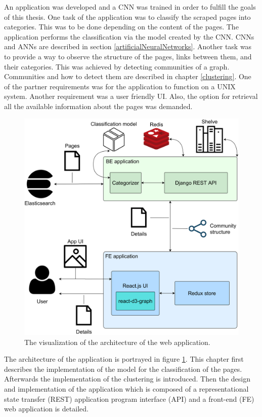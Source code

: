 \label{developmentIntroduction}
An application was developed and a CNN was trained in order to fulfill the goals of this thesis. One task of the application was to classify the scraped pages into categories. This was to be done depending on the content of the pages. The application performs the classification via the model created by the CNN. CNNs and ANNs are described in section \ref{artificialNeuralNetworks}. Another task was to provide a way to observe the structure of the pages, links between them, and their categories. This was achieved by detecting communities of a graph. Communities and how to detect them are described in chapter \ref{clustering}. One of the partner requirements was for the application to function on a UNIX system. Another requirement was a user friendly UI. Also, the option for retrieval all the available information about the pages was demanded. 

\begin{figure}
  \centering
  \includegraphics[width = \textwidth]{Images/ApplicationArchitecture.png}
  \caption{The visualization of the architecture of the web application.}
  \label{ApplicationArchitecture}
\end{figure}

The architecture of the application is portrayed in figure \ref{ApplicationArchitecture}. This chapter first describes the implementation of the model for the classification of the pages. Afterwards the implementation of the clustering is introduced. Then the design and implementation of the application which is composed of a representational state transfer (REST) application program interface (API) and a front-end (FE) web application is detailed. 

